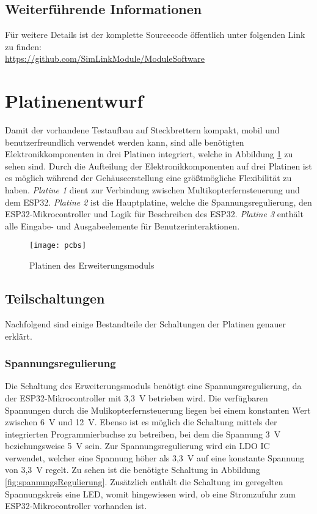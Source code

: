 \subsection{Weiterführende Informationen}
Für weitere Details ist der komplette Sourcecode öffentlich unter folgenden Link zu finden:\\ \url{https://github.com/SimLinkModule/ModuleSoftware}

\section{Platinenentwurf}
Damit der vorhandene Testaufbau auf Steckbrettern kompakt, mobil und benutzerfreundlich verwendet werden kann, sind alle benötigten Elektronikkomponenten in drei Platinen integriert, welche in Abbildung \ref{fig:pcbs} zu sehen sind. Durch die Aufteilung der Elektronikkomponenten auf drei Platinen ist es möglich während der Gehäuseerstellung eine größtmögliche Flexibilität zu haben. \textit{Platine 1} dient zur Verbindung zwischen Multikopterfernsteuerung und dem ESP32. \textit{Platine 2} ist die Hauptplatine, welche die Spannungsregulierung, den ESP32-Mikrocontroller und Logik für Beschreiben des ESP32. \textit{Platine 3} enthält alle Eingabe- und Ausgabeelemente für Benutzerinteraktionen.

\begin{figure}[h]
    \centering
    \texttt{[image: pcbs]}
    \caption{Platinen des Erweiterungsmoduls}
    \label{fig:pcbs}
\end{figure}

\subsection{Teilschaltungen}
Nachfolgend sind einige Bestandteile der Schaltungen der Platinen genauer erklärt.

\subsubsection{Spannungsregulierung}
Die Schaltung des Erweiterungsmoduls benötigt eine Spannungsregulierung, da der ESP32-Mikrocontroller mit 3,3~V betrieben wird. Die verfügbaren Spannungen durch die Mulikopterfernsteuerung liegen bei einem konstanten Wert zwischen 6~V und 12~V. Ebenso ist es möglich die Schaltung mittels der integrierten Programmierbuchse zu betreiben, bei dem die Spannung 3~V beziehungsweise 5~V sein. Zur Spannungsregulierung wird ein \ac{LDO} \ac{IC} verwendet, welcher eine Spannung höher als 3,3~V auf eine konstante Spannung von 3,3~V regelt. Zu sehen ist die benötigte Schaltung in Abbildung \ref{fig:spannungsRegulierung}. Zusätzlich enthält die Schaltung im geregelten Spannungskreis eine \acs{LED}, womit hingewiesen wird, ob eine Stromzufuhr zum ESP32-Mikrocontroller vorhanden ist.


